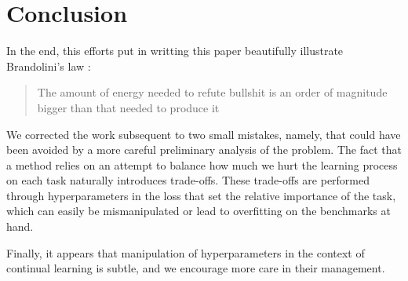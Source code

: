 \documentclass[11pt]{article}
\begin{document}
\section{Conclusion}



In the end, this efforts put in writting this paper beautifully illustrate Brandolini's law : 
\begin{quote}
    The amount of energy needed to refute bullshit is an order of magnitude bigger than that needed to produce it
\end{quote}
We corrected the work subsequent to two small mistakes, namely, that could have been avoided by a more careful preliminary analysis of the problem. The fact that a method relies on an attempt to balance how much we hurt the learning process on each task naturally introduces trade-offs. These trade-offs are performed through hyperparameters in the loss that set the relative importance of the task, which can easily be mismanipulated or lead to overfitting on the benchmarks at hand.


\vspace{1mm}
\noindent
Finally, it appears that manipulation of hyperparameters in the context of continual learning is subtle, and we encourage more care in their management.



\nocite{*}
\printbibliography
\end{document}
